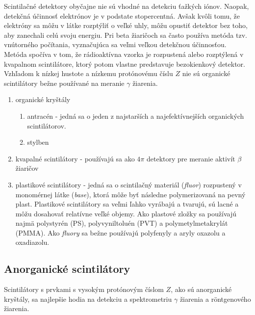 \documentclass[../../main.tex]{subfiles}
\begin{document}
Scintilačné detektory obyčajne nie sú vhodné na detekciu ťažkých iónov. Naopak, detekčná účinnosť elektrónov je v podstate stopercentná. Avšak kvôli tomu, že elektróny sa môžu v látke rozptýliť o veľké uhly, môžu opustiť detektor bez toho, aby zanechali celú svoju energiu. Pri beta žiaričoch sa často používa metóda tzv. vnútorného počítania, vyznačujúca sa veľmi veľkou detekčnou účinnosťou. Metóda spočíva v tom, že rádioaktívna vzorka je rozpustená alebo rozptýlená v kvapalnom scintilátore, ktorý potom vlastne predstavuje bezokienkový detektor. Vzhľadom k nízkej hustote a nízkemu protónovému číslu $Z$ nie sú organické scintilátory bežne používané na meranie $\gamma$ žiarenia.
\begin{enumerate}
\item organické kryštály
\begin{enumerate}
\item antracén - jedná sa o jeden z najstarších a najefektívnejších organických scintilátorov.
\item stylben
\end{enumerate}
\item kvapalné scintilátory - používajú sa ako $4\pi$ detektory pre meranie aktivít $\beta$ žiaričov
\item plastikové scintilátory - jedná sa o scintilačný materiál (\textit{fluor}) rozpustený v monomérnej látke (\textit{base}), ktorá môže byť následne polymerizovaná na pevný plast. Plastikové scintilátory sa veľmi ľahko vyrábajú a tvarujú, sú lacné a môžu dosahovať relatívne veľké objemy. Ako plastové zložky sa používajú najmä polystyrén (PS), polyvyniltoluén (PVT) a polymetylmetakrylát (PMMA). Ako \textit{fluory} sa bežne používajú polyfenyly a aryly oxazolu a oxadiazolu.
\end{enumerate}

\subsection{Anorganické scintilátory}

Scintilátory s prvkami s vysokým protónovým číslom $Z$, ako sú anorganické kryštály, sa najlepšie hodia na detekciu a spektrometriu $\gamma$ žiarenia a r\"{o}ntgenového žiarenia. 
\end{document}

